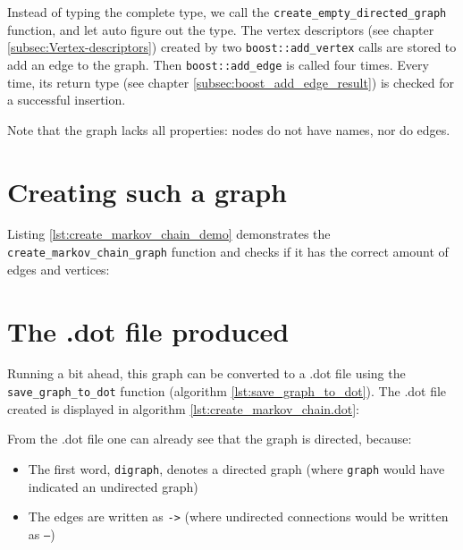 

Instead of typing the complete type, 
we call the \verb;create_empty_directed_graph;
function, and let auto figure out the type.
The vertex descriptors (see chapter \ref{subsec:Vertex-descriptors}) 
created by two \verb;boost::add_vertex; 
calls are stored to add an edge to the graph.
Then \verb;boost::add_edge; 
is called four times.
Every time, its return type 
(see chapter \ref{subsec:boost_add_edge_result}) 
is checked for a successful insertion.

Note that the graph lacks all properties: nodes do not have names, nor do
edges.

\section{Creating such a graph}

Listing \ref{lst:create_markov_chain_demo} demonstrates 
the \verb;create_markov_chain_graph; function and checks if it
has the correct amount of edges and vertices:



\section{The .dot file produced}
\label{subsec:create_markov_chain_dot}

Running a bit ahead, this graph can be converted to a .dot file using the
\verb;save_graph_to_dot; function (algorithm \ref{lst:save_graph_to_dot}).
The .dot file created is displayed in algorithm \ref{lst:create_markov_chain.dot}:



From the .dot file one can already see that the graph is directed, because:

\begin{itemize}
  \item The first word, \verb;digraph;, denotes a directed graph 
    (where \verb;graph; would have indicated an undirected graph)
  \item The edges are written as \verb;->; 
   (where undirected connections would be written as \verb;–;)
\end{itemize}

